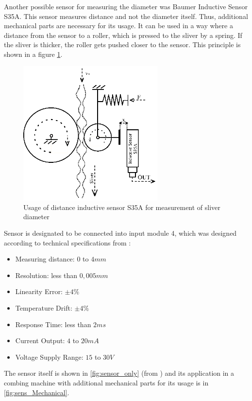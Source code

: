 \documentclass[twoside]{ctuthesis}
\theoremstyle{plain}
\theoremstyle{definition}
\theoremstyle{note}
\begin{document}
Another possible sensor for measuring the diameter was Baumer Inductive Sensor S35A. This sensor measures distance and not the diameter itself. Thus, additional mechanical parts are necessary for its usage. It can be used in a way where a distance from the sensor to a roller, which is pressed to the sliver by a spring. If the sliver is thicker, the roller gets pushed closer to the sensor. This principle is shown in a figure \ref{fig:inductiveSensorDiagram}.
\begin{figure}[h]
	\centering
	\includegraphics[width=0.65\textwidth]{SensorDiagram.eps}
	\caption{Usage of distance inductive sensor S35A for measurement of sliver diameter}
	\label{fig:inductiveSensorDiagram}
\end{figure}
Sensor is designated to be connected into input module 4, which was designed according to technical specifications from \cite{cite:InductiveSensor}:
\begin{itemize}
	\setlength{\itemsep}{5pt}
	\item Measuring distance: $0$ to $4mm$
	\item Resolution: less than $0,005 mm$
	\item Linearity Error: $\pm4\%$
	\item Temperature Drift: $\pm4\%$
	\item Response Time: less than $2ms$
	\item Current Output: $4$ to $20mA$
	\item Voltage Supply Range: $15$ to $30V$	
\end{itemize}
The sensor itself is shown in \ref{fig:sensor_only} (from \cite{cite:InductiveSensor}) and its application in a combing machine with additional mechanical parts for its usage is in \ref{fig:sens_Mechanical}.
\end{document}
